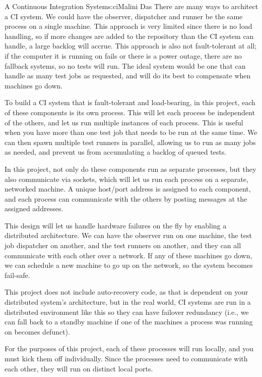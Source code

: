 \begin{aosachapter}{A Continuous Integration System}{s:ci}{Malini Das}
There are many ways to architect a CI system. We could have the
observer, dispatcher and runner be the same process on a single machine.
This approach is very limited since there is no load handling, so if
more changes are added to the repository than the CI system can handle,
a large backlog will accrue. This approach is also not fault-tolerant at
all; if the computer it is running on fails or there is a power outage,
there are no fallback systems, so no tests will run. The ideal system
would be one that can handle as many test jobs as requested, and will do
its best to compensate when machines go down.

To build a CI system that is fault-tolerant and load-bearing, in this
project, each of these components is its own process. This will let each
process be independent of the others, and let us run multiple instances
of each process. This is useful when you have more than one test job
that needs to be run at the same time. We can then spawn multiple test
runners in parallel, allowing us to run as many jobs as needed, and
prevent us from accumulating a backlog of queued tests.

In this project, not only do these components run as separate processes,
but they also communicate via sockets, which will let us run each
process on a separate, networked machine. A unique host/port address is
assigned to each component, and each process can communicate with the
others by posting messages at the assigned addresses.

This design will let us handle hardware failures on the fly by enabling
a distributed architecture. We can have the observer run on one machine,
the test job dispatcher on another, and the test runners on another, and
they can all communicate with each other over a network. If any of these
machines go down, we can schedule a new machine to go up on the network,
so the system becomes fail-safe.

This project does not include auto-recovery code, as that is dependent
on your distributed system's architecture, but in the real world, CI
systems are run in a distributed environment like this so they can have
failover redundancy (i.e., we can fall back to a standby machine if one
of the machines a process was running on becomes defunct).

For the purposes of this project, each of these processes will run
locally, and you must kick them off individually. Since the processes
need to communicate with each other, they will run on distinct local
ports.


\end{aosachapter}

